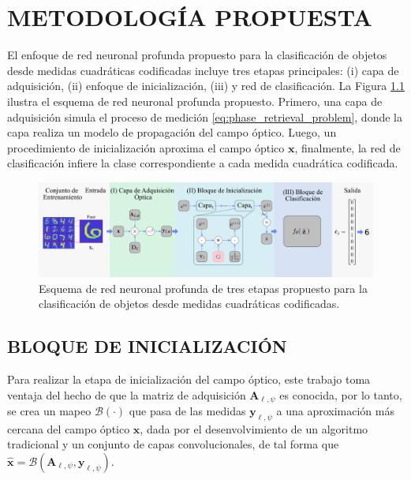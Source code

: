 
\chapter{METODOLOGÍA PROPUESTA}

El enfoque de red neuronal profunda propuesto para la clasificación de objetos desde medidas cuadráticas codificadas incluye tres etapas principales: (i) capa de adquisición, (ii) enfoque de inicialización, (iii) y red de clasificación. La Figura \ref{fig:esquema_entrenamiento} ilustra el esquema de red neuronal profunda propuesto. Primero, una capa de adquisición simula el proceso de medición \eqref{eq:phase_retrieval_problem}, donde la capa realiza un modelo de propagación del campo óptico. Luego, un procedimiento de inicialización aproxima el campo óptico $\mathbf{x}$, finalmente, la red de clasificación infiere la clase correspondiente a cada medida cuadrática codificada.


\begin{figure}[!h]
    \centering
    \includegraphics[width=\linewidth]{images/esquema_entrenamiento.pdf}
    \caption{Esquema de red neuronal profunda de tres etapas propuesto para la clasificación de objetos desde medidas cuadráticas codificadas.}
    \label{fig:esquema_entrenamiento}
\end{figure}


\section{BLOQUE DE INICIALIZACIÓN}

Para realizar la etapa de inicialización del campo óptico, este trabajo toma ventaja del hecho de que la matriz de adquisición $\mathbf{A}_{\ell, \psi}$ es conocida, por lo tanto, se crea un mapeo $\mathcal{B}(\cdot)$ que pasa de las medidas $\mathbf{y}_{\ell, \psi}$ a una aproximación más cercana del campo óptico $\mathbf{x}$, dada por el desenvolvimiento de un algoritmo tradicional y un conjunto de capas convolucionales, de tal forma que $\hat{\mathbf{x}}=\mathcal{B}(\mathbf{A}_{\ell, \psi}, \mathbf{y}_{\ell, \psi})$. 

